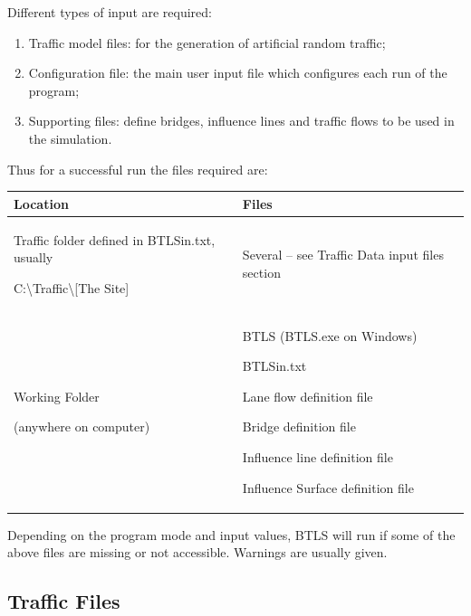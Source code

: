 \documentclass[
]{article}
\begin{document}
Different types of input are required:

\begin{enumerate}
\def\labelenumi{\arabic{enumi}.}
\item
  Traffic model files: for the generation of artificial random traffic;
\item
  Configuration file: the main user input file which configures each run
  of the program;
\item
  Supporting files: define bridges, influence lines and traffic flows to
  be used in the simulation.
\end{enumerate}

Thus for a successful run the files required are:

\begin{longtable}[]{@{}
  >{\raggedright\arraybackslash}p{}
  >{\raggedright\arraybackslash}p{}@{}}
\toprule\noalign{}
\begin{minipage}[b]{\linewidth}\raggedright
\textbf{Location}
\end{minipage} & \begin{minipage}[b]{\linewidth}\raggedright
\textbf{Files}
\end{minipage} \\
\midrule\noalign{}
\endhead
\bottomrule\noalign{}
\endlastfoot
Traffic folder defined in BTLSin.txt, usually

C:\textbackslash Traffic\textbackslash{[}The Site{]} & Several -- see
Traffic Data input files section \\
Working Folder

(anywhere on computer) & BTLS (BTLS.exe on Windows)

BTLSin.txt

Lane flow definition file

Bridge definition file

Influence line definition file

Influence Surface definition file \\
\end{longtable}

Depending on the program mode and input values, BTLS will run if some of
the above files are missing or not accessible. Warnings are usually
given.

\subsection{Traffic Files}\label{traffic-files}
\end{document}
